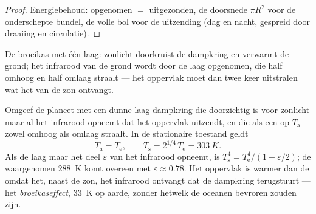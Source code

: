 \begin{proof}
Energiebehoud: opgenomen $= $ uitgezonden, de doorsnede $\pi R^2$
voor de onderschepte bundel, de volle bol voor de uitzending (dag en
nacht, gespreid door draaiing en circulatie).
\end{proof}

\begin{omfigure}

{\small De broeikas met één laag: zonlicht doorkruist de dampkring en
verwarmt de grond; het infrarood van de grond wordt door de laag opgenomen, die
half omhoog en half omlaag straalt --- het oppervlak moet dan twee keer
uitstralen wat het van de zon ontvangt.}
\end{omfigure}

\begin{proposition}\label{prop:b2:thermal-radiation:greenhouse}
Omgeef de planeet met een dunne laag dampkring die doorzichtig is
voor zonlicht maar al het infrarood opneemt dat het oppervlak uitzendt, en
die als een  op $T_{\text{a}}$ zowel omhoog als omlaag straalt. In de
stationaire toestand geldt
\[
T_{\text{a}} = T_{\text{e}}, \qquad
T_{\text{s}} = 2^{1/4}\,T_{\text{e}} = \qty{303}{K} .
\]
Als de laag maar het deel $\varepsilon$ van het infrarood opneemt, is
$T_{\text{s}}^4 = T_{\text{e}}^4/(1 - \varepsilon/2)$; de waargenomen
\qty{288}{K} komt overeen met $\varepsilon \approx 0.78$. Het oppervlak is
warmer dan de  omdat het, naast
de zon, het infrarood ontvangt dat de dampkring terugstuurt --- het
\emph{broeikaseffect}, \qty{33}{K} op aarde,
zonder hetwelk de oceanen bevroren zouden zijn.
\end{proposition}

